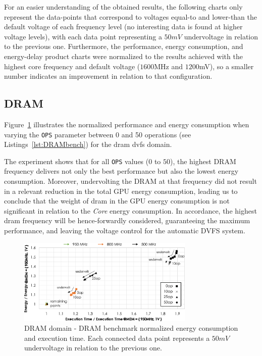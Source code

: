For an easier understanding of the obtained results, the following charts only represent the data-points that correspond to voltages equal-to and lower-than the default voltage of each frequency level (no interesting data is found at higher voltage levels), with each data point representing a $50mV$ undervoltage in relation to the previous one.
Furthermore, the performance, energy consumption, and energy-delay product charts were normalized to the results achieved with the highest core frequency and default voltage ($1600$MHz and $1200$mV), so a smaller number indicates an improvement in relation to that configuration. 

\subsection{DRAM}

Figure~\ref{fig:DRAM_behaviour} illustrates the normalized performance and energy consumption when varying the \texttt{OPS} parameter between 0 and 50 operations (see Listings~\ref{lst:DRAMbench}) for the \acrshort{dram} \acrshort{dvfs} domain.

The experiment shows that for all \texttt{OPS} values ($0$ to $50$), the highest DRAM frequency delivers not only the best performance but also the lowest energy consumption. Moreover, undervolting the DRAM at that frequency did not result in a relevant reduction in the total GPU energy consumption, leading us to conclude that the weight of \acrshort{dram} in the GPU energy consumption is not significant in relation to the \textit{Core} energy consumption. In accordance, the highest \acrshort{dram} frequency will be hence-forwardly considered, guaranteeing the maximum performance, and leaving the voltage control for the automatic DVFS system.


\begin{figure}[htb]
  \centering
  \includegraphics[width=0.75\textwidth]{Figures/GPU_characterization/DRAM_behaviour.pdf}
  \caption{DRAM domain - DRAM benchmark normalized energy consumption and execution time. Each connected data point represents a $50mV$ undervoltage in relation to the previous one.}
  \label{fig:DRAM_behaviour}
\end{figure}

